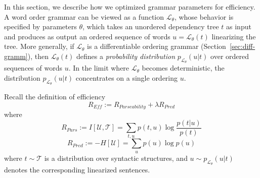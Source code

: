 \documentclass[10pt,twoside,lineno]{article}
\newcommand{\utterance}{\mathcal{U}}
\newcommand{\tree}{\mathcal{T}}
\begin{document}
In this section, we describe how we optimized grammar parameters for efficiency.
A word order grammar can be viewed as a function $\mathcal{L}_\theta$, whose behavior is specified by parameters $\theta$, which takes an unordered dependency tree $t$ as input and produces as output an ordered sequence of words $u = \mathcal{L}_\theta(t)$ linearizing the tree.
More generally, if $\mathcal{L}_\theta$ is a differentiable ordering grammar (Section~\ref{sec:diff-gramm}), then $\mathcal{L}_\theta(t)$ defines a \emph{probability distribution} $p_{\mathcal{L}_\theta}(u|t)$ over ordered sequences of words $u$.
In the limit where $\mathcal{L}_\theta$ becomes deterministic, the distribution $p_{\mathcal{L}_\theta}(u|t)$ concentrates on a single ordering $u$.

Recall the definition of efficiency
\begin{equation}\label{eq:efficiency-recall}
	R_{\textit{Eff}} := R_{\textit{Parseability}} + \lambda R_\textit{Pred}
\end{equation}
where
\begin{equation}
	R_{Pars} := I[\utterance,\tree] = \sum_{t,u} p(t,u) \log \frac{p(t|u)}{p(t)} 
\end{equation}
\begin{equation}
	R_{Pred} := - H[\utterance] = \sum_{u} p(u) \log p(u)
\end{equation}
where $t \sim \tree$ is a distribution over syntactic structures, and $u \sim p_{\mathcal{L}_\theta}(u|t)$ denotes the corresponding linearized sentences.
\end{document}
